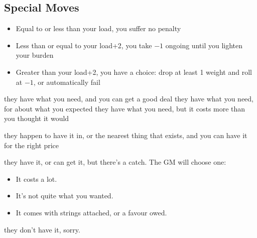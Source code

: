 \subsection{Special Moves}

\begin{itemize}
\item Equal to or less than your load, you suffer no penalty
\item Less than or equal to your load+2, you take $-1$ ongoing until you lighten your burden
\item Greater than your load+2, you have a choice: drop at least 1 weight and roll at $-1$, or automatically fail
\end{itemize}

{they have what you need, and you can get a good deal}
{they have what you need, for about what you expected}
{they have what you need, but it costs more than you thought it would}

{they happen to have it in, or the nearest thing that exists, and you can have it for the right price}
{they have it, or can get it, but there's a catch. The GM will choose one:
\begin{itemize}
\item It costs a lot.
\item It's not quite what you wanted.
\item It comes with strings attached, or a favour owed.
\end{itemize}}
{they don't have it, sorry.}